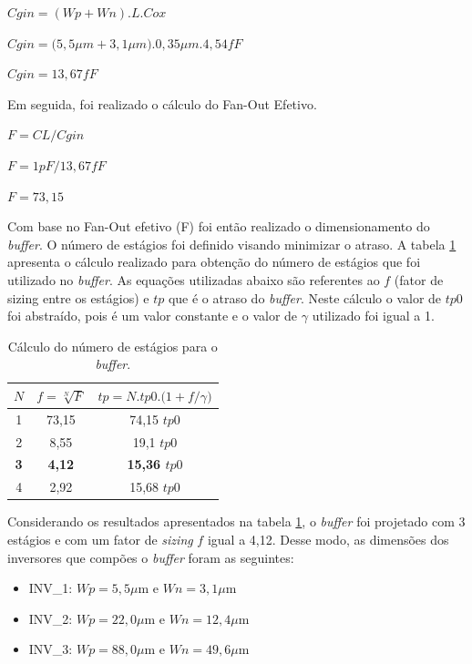 \documentclass[a4paper,10pt] {article}
\begin{document}
\vspace{2mm}
$Cgin=(Wp+Wn).L.Cox$

$Cgin=(5,5$$\mu$$m+3,1$$\mu$$m).0,35$$\mu$$m.4,54fF$

$Cgin=13,67fF$

\vspace{2mm}

Em seguida, foi realizado o cálculo do Fan-Out Efetivo.
\vspace{2mm}

$F=CL/Cgin$

$F=1pF/13,67fF$

$F=73,15$
\vspace{2mm}

Com base no Fan-Out efetivo (F) foi então realizado o dimensionamento do \textit{buffer}. O número de estágios foi definido visando minimizar o atraso. A tabela \ref{tab:table1} apresenta o cálculo realizado para obtenção do número de estágios que foi utilizado no \textit{buffer}. As equações utilizadas abaixo são referentes ao $f$ (fator de sizing entre os estágios) e $tp$ que é o atraso do \textit{buffer}. Neste cálculo o valor de $tp0$ foi abstraído, pois é um valor constante e o valor de $\gamma$ utilizado foi igual a 1.

\begin{table}[h]
	\centering
	\caption{Cálculo do número de estágios para o \textit{buffer}.}
	\begin{tabular}{c|c|c}
		\hline
		$N$ & $f=\sqrt[N]{F}$ & $tp=N.tp0.(1+f/$$\gamma$$)$\\
		\hline
		1 & 73,15 & 74,15 $tp0$ \\
		2 & 8,55  & 19,1 $tp0$ \\
		\textbf{3} & \textbf{4,12}  & \textbf {15,36 $tp0$} \\
		4 & 2,92  & 15,68 $tp0$ \\
 		\hline
	\end{tabular}
	\label{tab:table1}
\end{table}

Considerando os resultados apresentados na tabela \ref{tab:table1}, o \textit{buffer} foi projetado com 3 estágios e com um fator de \textit{sizing} $f$ igual a 4,12. Desse modo, as dimensões dos inversores que compões o \textit{buffer} foram as seguintes:

\begin{itemize}
\item INV\_1: $Wp=5,5$$\mu$m e $Wn=3,1$$\mu$m
\item INV\_2: $Wp=22,0$$\mu$m e $Wn=12,4$$\mu$m
\item INV\_3: $Wp=88,0$$\mu$m e $Wn=49,6$$\mu$m
\end{itemize}
\end{document}
